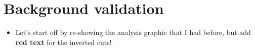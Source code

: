 \section{Background validation}
\label{sec:bkg-val-regns}

\begin{itemize}
\item Let's start off by re-showing the analysis graphic that I had before, but add \textbf{red text} for the inverted cuts!
\end{itemize}